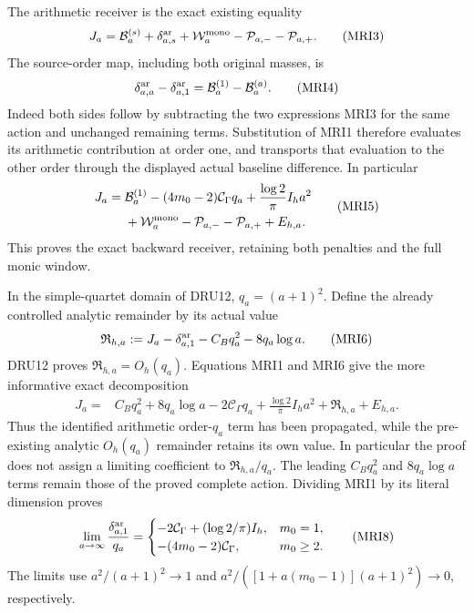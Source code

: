 The arithmetic receiver is the exact existing equality
\[
 J_a=\mathcal B_a^{(s)}+\delta_{a,s}^{\rm ar}
               +\mathcal W_a^{\rm mono}-\mathcal P_{a,-}-\mathcal P_{a,+}.
 \tag{MRI3}
\]
The source-order map, including both original masses, is
\[
 \delta_{a,a}^{\rm ar}-\delta_{a,1}^{\rm ar}
     =\mathcal B_a^{(1)}-\mathcal B_a^{(a)}.
 \tag{MRI4}
\]
Indeed both sides follow by subtracting the two expressions MRI3 for
the same action and unchanged remaining terms. Substitution of MRI1
therefore evaluates its arithmetic contribution at order one, and
transports that evaluation to the other order through the displayed
actual baseline difference. In particular
\[
 \begin{split}
 J_a={}&\mathcal B_a^{(1)}-(4m_0-2)\mathcal C_\Gamma q_a
       +\frac{\log2}{\pi}I_h a^2\\
      &+\mathcal W_a^{\rm mono}-\mathcal P_{a,-}-\mathcal P_{a,+}+E_{h,a}.
 \end{split}\tag{MRI5}
\]
This proves the exact backward receiver, retaining both penalties and
the full monic window.

In the simple-quartet domain of DRU12, $q_a=(a+1)^2$. Define the
already controlled analytic remainder by its actual value
\[
 \mathfrak R_{h,a}:=J_a-\delta_{a,1}^{\rm ar}
                          -C_Bq_a^2-8q_a\log a.
 \tag{MRI6}
\]
DRU12 proves $\mathfrak R_{h,a}=O_h(q_a)$. Equations MRI1 and MRI6
give the more informative exact decomposition
\[
 \begin{split}
 J_a={}&C_Bq_a^2+8q_a\log a-2\mathcal C_\Gamma q_a
        +\frac{\log2}{\pi}I_h a^2+\mathfrak R_{h,a}+E_{h,a}.
 \end{split}\tag{MRI7}
\]
Thus the identified arithmetic order-$q_a$ term has been propagated,
while the pre-existing analytic $O_h(q_a)$ remainder retains its
own value. In particular the proof does not assign a limiting
coefficient to $\mathfrak R_{h,a}/q_a$. The leading $C_Bq_a^2$ and
$8q_a\log a$ terms remain those of the proved complete action.
Dividing MRI1 by its literal dimension proves
\[
 \lim_{a\to\infty}\frac{\delta_{a,1}^{\rm ar}}{q_a}
 =\begin{cases}
 -2\mathcal C_\Gamma+(\log2/\pi)I_h,&m_0=1,\\
 -(4m_0-2)\mathcal C_\Gamma,&m_0\ge2.
 \end{cases}\tag{MRI8}
\]
The limits use $a^2/(a+1)^2\to1$ and
$a^2/([1+a(m_0-1)](a+1)^2)\to0$, respectively.

